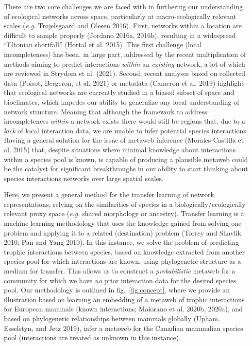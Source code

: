 \documentclass[11pt]{article}
\begin{document}
There are two core challenges we are faced with in furthering our
understanding of ecological networks across space, particularly at
macro-ecologically relevant scales (\emph{e.g.} Trøjelsgaard and Olesen
2016). First, networks within a location are difficult to sample
properly (Jordano 2016a, 2016b), resulting in a widespread ``Eltonian
shortfall'' (Hortal et al. 2015). This first challenge (local
incompleteness) has been, in large part, addressed by the recent
multiplication of methods aiming to predict interactions \emph{within}
an \emph{existing} network, a lot of which are reviewed in Strydom et
al. (2021). Second, recent analyses based on collected data (Poisot,
Bergeron, et al. 2021) or metadata (Cameron et al. 2019) highlight that
ecological networks are currently studied in a biased subset of space
and bioclimates, which impedes our ability to generalize any local
understanding of network structure. Meaning that although the framework
to address incompleteness \emph{within} a network exists there would
still be regions that, due to a \emph{lack} of local interaction data,
we are unable to infer potential species interactions. Having a general
solution for the issue of metaweb inference (Morales-Castilla et al.
2015) that, despite situations where minimal knowledge about
interactions within a species pool is known, is capable of producing a
plausible metaweb could be the catalyst for significant breakthroughs in
our ability to start thinking about species interactions networks over
large spatial scales.

Here, we present a general method for the transfer learning of network
representations, relying on the similarities of species in a
biologically/ecologically relevant proxy space (\emph{e.g.} shared
morphology or ancestry). Transfer learning is a machine learning
methodology that uses the knowledge gained from solving one problem and
applying it to a related (destination) problem (Torrey and Shavlik 2010;
Pan and Yang 2010). In this instance, we solve the problem of predicting
trophic interactions between species, based on knowledge extracted from
another species pool for which interactions are known, using
phylogenetic structure as a medium for transfer. This allows us to
construct a \emph{probabilistic} metaweb for a community for which we
have \emph{no} prior interaction data for the desired species pool. Our
methodology is outlined in fig.~\ref{fig:concept}, where we provide an
illustration based on learning an embedding of a metaweb of trophic
interactions for European mammals (known interactions; Maiorano et al.
2020b, 2020a), and based on phylogenetic relationships between mammals
globally (Upham, Esselstyn, and Jetz 2019), infer a metaweb for the
Canadian mammalian species pool (interactions are treated as unknown in
this instance).
\end{document}
